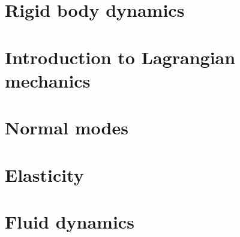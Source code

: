 \documentclass[a4paper]{article}
\begin{document}
\section{Rigid body dynamics}
\section{Introduction to Lagrangian mechanics}
\section{Normal modes}
\section{Elasticity}
\section{Fluid dynamics}
\end{document}
